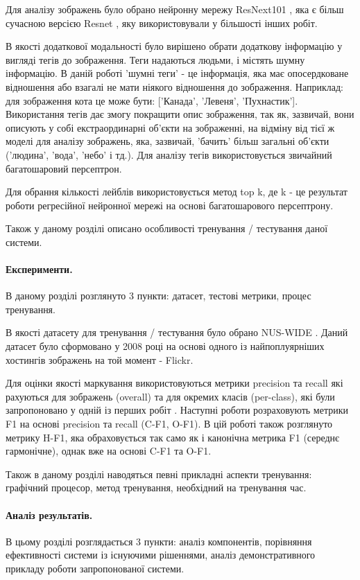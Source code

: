\documentclass{udstu}
\begin{document}
Для аналізу зображень було обрано нейронну мережу
ResNext101 \cite{resnext}, яка є більш сучасною версією Resnet \cite{resnet},
яку використовували у більшості інших робіт.

В якості додаткової модальності було вирішено обрати додаткову інформацію у вигляді тегів до зображення.
Теги надаються людьми, і містять шумну інформацію. В даній роботі 'шумні теги' - це інформація,
яка має опосердковане відношення або взагалі не мати ніякого відношення до зображення. Наприклад:
для зображення кота це може бути: ['Канада', 'Левеня', 'Пухнастик']. Використання тегів дає змогу
покращити опис зображення, так як, зазвичай, вони описують у собі екстраординарні об'єкти на зображенні,
на відміну від тієї ж моделі для аналізу зображень, яка, зазвичай, 'бачить' більш загальні об'єкти ('людина',
'вода', 'небо' і тд.). Для аналізу тегів використовується звичайний багатошаровий персептрон.

Для обрання кількості лейблів використовується метод top k, де k - це результат роботи регресійної
нейронної мережі на основі багатошарового персептрону.

Також у даному розділі описано особливості тренування / тестування даної системи.

\paragraph{\textbf{Експерименти.}}
В даному розділі розглянуто 3 пункти: датасет, тестові метрики, процес тренування.

В якості датасету для тренування / тестування було обрано NUS-WIDE \cite{nus-wide-civr09}.
Даний датасет було сформовано у 2008 році на основі одного із найпоплуярніших хостингів
зображень на той момент - Flickr.

Для оцінки якості маркування використовуються метрики precision та recall які рахуються
для зображень (overall) та для окремих класів (per-class),
які були запропоновано у одній із перших робіт \cite{cnn-labeling}.
Наступні роботи розраховують метрики F1 на основі precision та recall (C-F1, O-F1).
В цій роботі також розглянуто метрику H-F1, яка обраховується так само як
і канонічна метрика F1 (середнє гармонічне), однак вже на основі C-F1 та O-F1.

Також в даному розділі наводяться певні прикладні аспекти тренування: графічний процесор,
метод тренування, необхідний на тренування час.

\paragraph{\textbf{Аналіз результатів.}}
В цьому розділі розглядається 3 пункти: аналіз компонентів, порівняння ефективності системи із існуючими рішеннями,
аналіз демонстративного прикладу роботи запропонованої системи.
\end{document}
